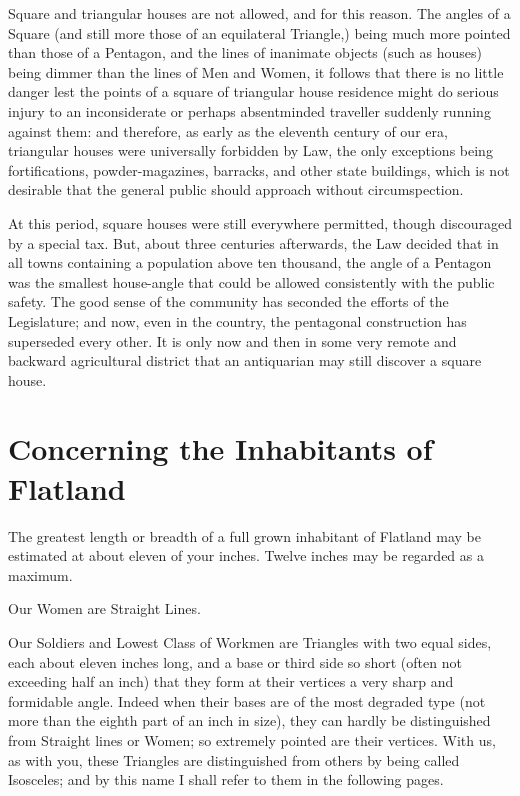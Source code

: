 \documentclass[10pt, kindle, oneside]{kindle}
\begin{document}
Square and triangular houses are not allowed, and for this reason. The angles
of a Square (and still more those of an equilateral Triangle,) being much more
pointed than those of a Pentagon, and the lines of inanimate objects (such as
houses) being dimmer than the lines of Men and Women, it follows that there is
no little danger lest the points of a square of triangular house residence
might do serious injury to an inconsiderate or perhaps absentminded traveller
suddenly running against them: and therefore, as early as the eleventh century
of our era, triangular houses were universally forbidden by Law, the only
exceptions being fortifications, powder-magazines, barracks, and other state
buildings, which is not desirable that the general public should approach
without circumspection.

At this period, square houses were still everywhere permitted, though
discouraged by a special tax. But, about three centuries afterwards, the Law
decided that in all towns containing a population above ten thousand, the
angle of a Pentagon was the smallest house-angle that could be allowed
consistently with the public safety. The good sense of the community has
seconded the efforts of the Legislature; and now, even in the country, the
pentagonal construction has superseded every other. It is only now and then in
some very remote and backward agricultural district that an antiquarian may
still discover a square house.


\chapter{Concerning the Inhabitants of Flatland}


The greatest length or breadth of a full grown inhabitant of Flatland may be
estimated at about eleven of your inches. Twelve inches may be regarded as a
maximum.

Our Women are Straight Lines.

Our Soldiers and Lowest Class of Workmen are Triangles with two equal sides,
each about eleven inches long, and a base or third side so short (often not
exceeding half an inch) that they form at their vertices a very sharp and
formidable angle. Indeed when their bases are of the most degraded type (not
more than the eighth part of an inch in size), they can hardly be
distinguished from Straight lines or Women; so extremely pointed are their
vertices. With us, as with you, these Triangles are distinguished from others
by being called Isosceles; and by this name I shall refer to them in the
following pages.
\end{document}
